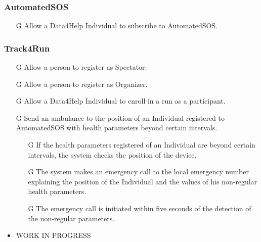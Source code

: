 \documentclass[../../rasd.tex]{subfiles}
\begin{document}
				\subsubsection{AutomatedSOS}
					\begin{itemize}
						\item[G\subs{8}]Allow a Data4Help Individual to subscribe to AutomatedSOS.
					\end{itemize}
				\subsubsection{Track4Run}
					\begin{itemize}
						\item[G\subs{9}]Allow a person to register as Spectator.
						\item[G\subs{10}]Allow a person to register as Organizer.
						\item[G\subs{11}]Allow a Data4Help Individual to enroll in a run as a participant.
					\end{itemize}
			\begin{itemize}					
				
				
					
				
					
				\item[G\subs{9}]Send an ambulance to the position of an Individual registered to AutomatedSOS with health parameters beyond certain intervals.
					\begin{itemize}
						\item[G\subs{9.1}]If the health parameters registered of an Individual are beyond certain intervals, the system checks the position of the device.
						\item[G\subs{9.2}]The system makes an emergency call to the local emergency number explaining the position of the Individual and the values of his non-regular health parameters.
						\item[G\subs{9.3}]The emergency call is initiated within five seconds of the detection of the non-regular parameters.
					\end{itemize}


				\item WORK IN PROGRESS
			\end{itemize}
			
			
\end{document}
